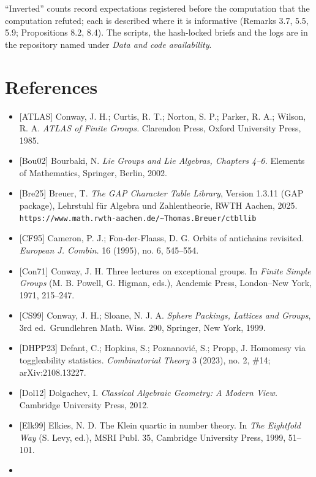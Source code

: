 \documentclass[
]{article}
\providecommand{\tightlist}{%
  \setlength{\itemsep}{0pt}\setlength{\parskip}{0pt}}
\begin{document}
``Inverted'' counts record expectations registered before the
computation that the computation refuted; each is described where it is
informative (Remarks 3.7, 5.5, 5.9; Propositions 8.2, 8.4). The scripts,
the hash-locked briefs and the logs are in the repository named under
\emph{Data and code availability}.

\section{References}\label{references}

\begin{itemize}
\tightlist
\item
  {[}ATLAS{]} Conway, J. H.; Curtis, R. T.; Norton, S. P.; Parker, R.
  A.; Wilson, R. A. \emph{ATLAS of Finite Groups.} Clarendon Press,
  Oxford University Press, 1985.
\item
  {[}Bou02{]} Bourbaki, N. \emph{Lie Groups and Lie Algebras, Chapters
  4--6.} Elements of Mathematics, Springer, Berlin, 2002.
\item
  {[}Bre25{]} Breuer, T. \emph{The GAP Character Table Library}, Version
  1.3.11 (GAP package), Lehrstuhl für Algebra und Zahlentheorie, RWTH
  Aachen, 2025.
  \texttt{https://www.math.rwth-aachen.de/\textasciitilde{}Thomas.Breuer/ctbllib}
\item
  {[}CF95{]} Cameron, P. J.; Fon-der-Flaass, D. G. Orbits of antichains
  revisited. \emph{European J. Combin.} 16 (1995), no. 6, 545--554.
\item
  {[}Con71{]} Conway, J. H. Three lectures on exceptional groups. In
  \emph{Finite Simple Groups} (M. B. Powell, G. Higman, eds.), Academic
  Press, London--New York, 1971, 215--247.
\item
  {[}CS99{]} Conway, J. H.; Sloane, N. J. A. \emph{Sphere Packings,
  Lattices and Groups}, 3rd ed.~Grundlehren Math. Wiss. 290, Springer,
  New York, 1999.
\item
  {[}DHPP23{]} Defant, C.; Hopkins, S.; Poznanović, S.; Propp, J.
  Homomesy via toggleability statistics. \emph{Combinatorial Theory} 3
  (2023), no. 2, \#14; arXiv:2108.13227.
\item
  {[}Dol12{]} Dolgachev, I. \emph{Classical Algebraic Geometry: A Modern
  View.} Cambridge University Press, 2012.
\item
  {[}Elk99{]} Elkies, N. D. The Klein quartic in number theory. In
  \emph{The Eightfold Way} (S. Levy, ed.), MSRI Publ. 35, Cambridge
  University Press, 1999, 51--101.
\item

\end{itemize}
\end{document}
